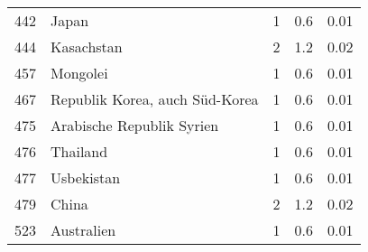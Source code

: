 \begin{longtable}{lXrrr}
        442 & \multicolumn{1}{X}{Japan} & %
          \num{1} &
          \num[round-mode=places,round-precision=2]{0.6} &
          \num[round-mode=places,round-precision=2]{0.01} \\

        444 & \multicolumn{1}{X}{Kasachstan} & %
          \num{2} &
          \num[round-mode=places,round-precision=2]{1.2} &
          \num[round-mode=places,round-precision=2]{0.02} \\

        457 & \multicolumn{1}{X}{Mongolei} & %
          \num{1} &
          \num[round-mode=places,round-precision=2]{0.6} &
          \num[round-mode=places,round-precision=2]{0.01} \\

        467 & \multicolumn{1}{X}{Republik Korea, auch Süd-Korea} & %
          \num{1} &
          \num[round-mode=places,round-precision=2]{0.6} &
          \num[round-mode=places,round-precision=2]{0.01} \\

        475 & \multicolumn{1}{X}{Arabische Republik Syrien} & %
          \num{1} &
          \num[round-mode=places,round-precision=2]{0.6} &
          \num[round-mode=places,round-precision=2]{0.01} \\

        476 & \multicolumn{1}{X}{Thailand} & %
          \num{1} &
          \num[round-mode=places,round-precision=2]{0.6} &
          \num[round-mode=places,round-precision=2]{0.01} \\

        477 & \multicolumn{1}{X}{Usbekistan} & %
          \num{1} &
          \num[round-mode=places,round-precision=2]{0.6} &
          \num[round-mode=places,round-precision=2]{0.01} \\

        479 & \multicolumn{1}{X}{China} & %
          \num{2} &
          \num[round-mode=places,round-precision=2]{1.2} &
          \num[round-mode=places,round-precision=2]{0.02} \\

        523 & \multicolumn{1}{X}{Australien} & %
          \num{1} &
          \num[round-mode=places,round-precision=2]{0.6} &
          \num[round-mode=places,round-precision=2]{0.01} \\


\end{longtable}
